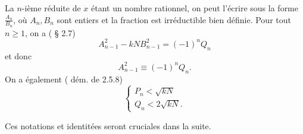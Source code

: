  La $n$-ième réduite de $x$ étant un nombre rationnel, on peut l'écrire sous la
 forme $\frac{A_n}{B_n}$, où $A_n, B_n$ sont entiers et la fraction est
 irréductible bien définie. Pour tout $n\geqslant 1$, on a (\cite{Lauritzen} §
 2.7) \[A_{n-1}^2 - kN B_{n-1}^2 = (-1)^n Q_n\] et donc
\begin{equation}
	A_{n-1}^2 \equiv (-1)^n Q_n.
\end{equation}
On a également (\cite{Lauritzen} dém. de 2.5.8)
\begin{equation}
	\begin{cases}
		P_n < \sqrt{kN} \\
		Q_n < 2\sqrt{kN}.
	\end{cases}
\end{equation}

Ces notations et identitées seront cruciales dans la suite.
